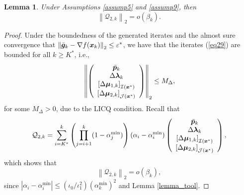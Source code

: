 \documentclass[aos]{imsart}
\numberwithin{equation}{section}
\theoremstyle{plain}
\newtheorem{lemma}{Lemma}
\begin{document}
\begin{appendix}
\begin{lemma}
\label{lemma16}
    Under Assumptions \ref{assump5} and  \ref{assump9}, 
    then 
    \begin{equation*}
        \left\|\mathcal{Q}_{2,k} \right\|_2 = o\left( \beta_k \right).
    \end{equation*}
\end{lemma}

\begin{proof}
    Under the boundedness of the generated iterates and the almost sure convergence that $\left\| \Bar{\bm{g}}_k - \nabla f(\bm{x}_k) \right\|_2 \leq \varepsilon^{*}$, we have that the iterates (\ref{eq29}) are bounded for all $k \geq K^{*}$, i.e., 
    \begin{equation*}
        \left\| \left( \begin{array}{c}
        \Bar{\bm{p}}_k \\
        \Delta \bm{\lambda}_{k}\\
        \left[\Delta \bm{\mu}_{1,k} \right]_{\mathcal{I}(\bm{x}^{*})} \\
        \left[\Delta \bm{\mu}_{2,k} \right]_{\mathcal{J}(\bm{x}^{*})}
    \end{array} \right) \right\|_2 \leq M_{\Delta},
    \end{equation*}
    for some $M_{\Delta} > 0$, due to the LICQ condition. Recall that 
    \begin{equation*}
        \mathcal{Q}_{2,k} = \sum_{i=K^{*}}^{k} \left( \prod_{j=i+1}^{k} (1-\alpha^{\min}_j) \right) (\alpha_i - \alpha^{\min}_i) \left( \begin{array}{c}
        \Bar{\bm{p}}_k \\
        \Delta \bm{\lambda}_{k}\\
        \left[\Delta \bm{\mu}_{1,k} \right]_{\mathcal{I}(\bm{x}^{*})} \\
        \left[\Delta \bm{\mu}_{2,k} \right]_{\mathcal{J}(\bm{x}^{*})}
        \end{array} \right),
    \end{equation*}
    which shows that
    \begin{equation*}
        \left\| \mathcal{Q}_{2,k} \right\|_2 = o\left( \beta_k \right),
    \end{equation*}
    since $|\alpha_i - \alpha^{\min}_i| \leq (\iota_0/\iota_1^2) (\alpha^{\min}_k)^2$ and Lemma \ref{lemma_tool}.
\end{proof}



\end{appendix}
\end{document}
